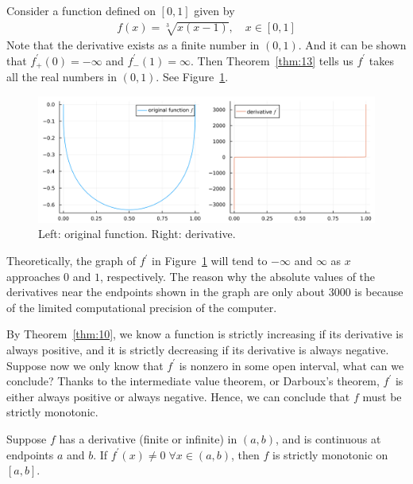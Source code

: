 \documentclass[thmcnt=section, 12pt]{my-elegantbook}
\begin{document}
\begin{example}
    Consider a function defined on $[0, 1]$ given by
    \begin{align*}
        f(x) = \sqrt[3]{x(x-1)},
        \quad x \in [0, 1]
    \end{align*}
    Note that the derivative exists as a finite number in $(0, 1)$. And it can be shown that $f^\prime_{+}(0) = -\infty$ and $f^\prime_{-}(1) = \infty$. Then Theorem~\ref{thm:13} tells us $f^\prime$ takes all the real numbers in $(0, 1)$. See Figure~\ref{fig:5}.
    \begin{figure}[ht]
        \centering
        \includegraphics[scale=0.2]{figures/graph-006.png}
        \caption{Left: original function. Right: derivative.}
        \label{fig:5}
    \end{figure}

    \begin{note}
        Theoretically, the graph of $f^\prime$ in Figure~\ref{fig:5} will tend to $-\infty$ and $\infty$ as $x$ approaches $0$ and $1$, respectively. The reason why the absolute values of the derivatives near the endpoints shown in the graph are only about $3000$ is because of the limited computational precision of the computer.
    \end{note}
\end{example}


\par By Theorem~\ref{thm:10}, we know a function is strictly increasing if its derivative is always positive, and it is strictly decreasing if its derivative is always negative. Suppose now we only know that $f^\prime$ is nonzero in some open interval, what can we conclude? Thanks to the intermediate value theorem, or Darboux's theorem, $f^\prime$ is either always positive or always negative. Hence, we can conclude that $f$ must be strictly monotonic.

\begin{theorem}
    Suppose $f$ has a derivative (finite or infinite) in $(a, b)$, and is continuous at endpoints $a$ and $b$. If $f^\prime(x) \neq 0 \; \forall x \in (a, b)$, then $f$ is strictly monotonic on $[a, b]$.
\end{theorem}
\end{document}
